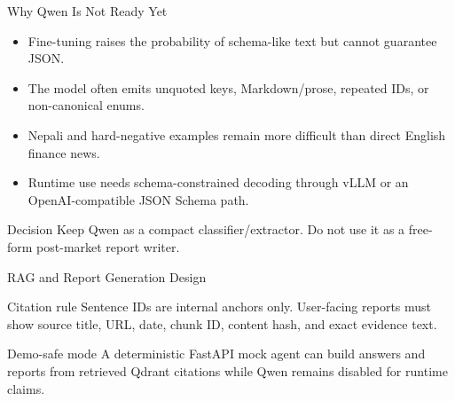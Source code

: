 \documentclass[aspectratio=169,11pt,hyperref={bookmarks=false}]{beamer}
\newcommand{\smallsep}{\vspace{0.35em}}
\begin{document}
\begin{frame}{Why Qwen Is Not Ready Yet}
  \begin{itemize}
    \item Fine-tuning raises the probability of schema-like text but cannot guarantee JSON.
    \item The model often emits unquoted keys, Markdown/prose, repeated IDs, or non-canonical enums.
    \item Nepali and hard-negative examples remain more difficult than direct English finance news.
    \item Runtime use needs schema-constrained decoding through vLLM or an OpenAI-compatible JSON Schema path.
  \end{itemize}
  \smallsep
  \begin{block}{Decision}
    Keep Qwen as a compact classifier/extractor. Do not use it as a free-form post-market report writer.
  \end{block}
\end{frame}

\begin{frame}{RAG and Report Generation Design}
  \centering
  \smallsep
  \begin{block}{Citation rule}
    Sentence IDs are internal anchors only. User-facing reports must show source title, URL, date, chunk ID, content hash, and exact evidence text.
  \end{block}
  \begin{block}{Demo-safe mode}
    A deterministic FastAPI mock agent can build answers and reports from retrieved Qdrant citations while Qwen remains disabled for runtime claims.
  \end{block}
\end{frame}
\end{document}
